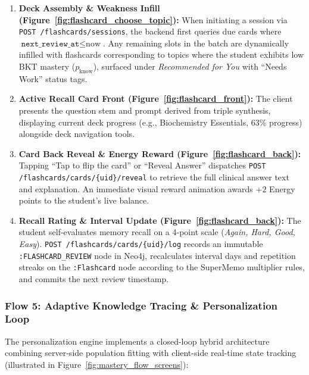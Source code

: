 \begin{enumerate}
    \item \textbf{Deck Assembly \& Weakness Infill (Figure~\ref{fig:flashcard_choose_topic}):} When initiating a session via \texttt{POST /flashcards/sessions}, the backend first queries due cards where $\texttt{next\_review\_at} \le \text{now}$. Any remaining slots in the batch are dynamically infilled with flashcards corresponding to topics where the student exhibits low BKT mastery ($p_{\text{know}}$), surfaced under \textit{Recommended for You} with ``Needs Work'' status tags.
    \item \textbf{Active Recall Card Front (Figure~\ref{fig:flashcard_front}):} The client presents the question stem and prompt derived from triple synthesis, displaying current deck progress (e.g., Biochemistry Essentials, 63\% progress) alongside deck navigation tools.
    \item \textbf{Card Back Reveal \& Energy Reward (Figure~\ref{fig:flashcard_back}):} Tapping ``Tap to flip the card'' or ``Reveal Answer'' dispatches \texttt{POST /flashcards/cards/\{uid\}/reveal} to retrieve the full clinical answer text and explanation. An immediate visual reward animation awards $+2$ Energy points to the student's live balance.
    \item \textbf{Recall Rating \& Interval Update (Figure~\ref{fig:flashcard_back}):} The student self-evaluates memory recall on a 4-point scale (\textit{Again, Hard, Good, Easy}). \texttt{POST /flashcards/cards/\{uid\}/log} records an immutable \texttt{:FLASHCARD\_REVIEW} node in Neo4j, recalculates interval days and repetition streaks on the \texttt{:Flashcard} node according to the SuperMemo multiplier rules, and commits the next review timestamp.
\end{enumerate}

\subsubsection*{Flow 5: Adaptive Knowledge Tracing \& Personalization Loop}

The personalization engine implements a closed-loop hybrid architecture combining server-side population fitting with client-side real-time state tracking (illustrated in Figure~\ref{fig:mastery_flow_screens}):

